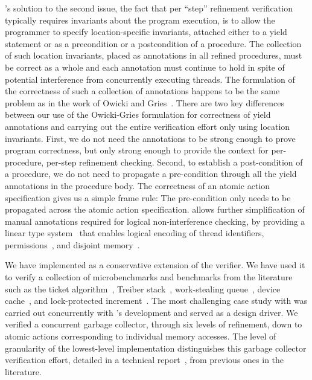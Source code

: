 \civl's solution to the second issue, the fact that per ``step'' refinement verification typically requires invariants about the program execution, is to allow the programmer to specify location-specific invariants, attached either to a yield statement
or as a precondition or a postcondition of a procedure. 
The collection of such location invariants, placed as annotations in all refined procedures, must be correct as a whole and each  annotation must continue to hold in spite of potential interference from concurrently executing threads.
The formulation of the correctness of such a collection of annotations happens to be the same problem as in the work of Owicki and Gries~\cite{OwickiG76}. 
There are two key differences between our use of the Owicki-Gries formulation for correctness of yield annotations and carrying out the entire verification effort only using location invariants. 
First, we do not need the annotations to be strong enough to prove program correctness, but only strong enough to provide the context for per-procedure, per-step refinement checking. Second, to establish a post-condition of a procedure, we do not need to propagate a pre-condition through all the yield annotations in the procedure body. The correctness of an atomic action specification gives us a simple frame rule: The pre-condition only needs to be propagated across the atomic action specification. 
\civl allows further simplification of manual annotations required for logical non-interference checking, 
by providing a linear type system~\cite{Wadler90lineartypes} 
that enables logical encoding of thread identifiers, permissions~\cite{boyland:03fractions}, 
and disjoint memory~\cite{LahiriQW11}.

We have implemented \civl as a conservative extension of the \boogie verifier.  
We have used it to verify a collection of microbenchmarks and benchmarks from the literature such as the ticket algorithm~\cite{ticket}, Treiber stack~\cite{treiber}, work-stealing queue~\cite{wsq},
device cache~\cite{device-cache}, and lock-protected increment~\cite{incr}. 
The most challenging case study with \civl was carried out concurrently with \civl's development and served as a design driver. 
We verified a concurrent garbage collector, through six levels of refinement, down to atomic actions corresponding to individual memory accesses. The level of granularity of the lowest-level implementation distinguishes this garbage collector verification effort, detailed in a technical report~\cite{gc-techreport}, from previous ones in the literature. 

